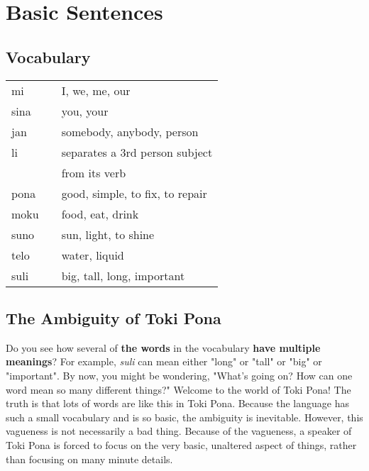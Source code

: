 \section{Basic Sentences}
\subsection*{Vocabulary}
\begin{supertabular}{p{5,5cm}|ll}
mi &&  I, we, me, our  \\
sina &&  you, your  \\
jan && somebody, anybody, person  \\                     
li && separates a 3rd person subject \\ && from its verb \\
pona &&  good, simple, to fix, to repair \\
moku &&  food, eat, drink \\
suno &&  sun, light, to shine  \\
telo &&  water, liquid  \\
suli &&  big, tall, long, important \\
\end{supertabular} 
%
\subsection*{The Ambiguity of Toki Pona}
%
Do you see how several of \textbf{the words} in the vocabulary \textbf{have multiple meanings}? 
For example, \textit{suli} can mean either "long" or "tall" or "big" or "important". 
By now, you might be wondering, "What's going on? How can one word mean so many different things?" 
Welcome to the world of Toki Pona! The truth is that lots of words are like this in Toki Pona. 
Because the language has such a small vocabulary and is so basic, the ambiguity is inevitable. 
However, this vagueness is not necessarily a bad thing. Because of the vagueness, a speaker of Toki Pona is forced to focus on the very basic, unaltered aspect of things, rather than focusing on many minute details. 

